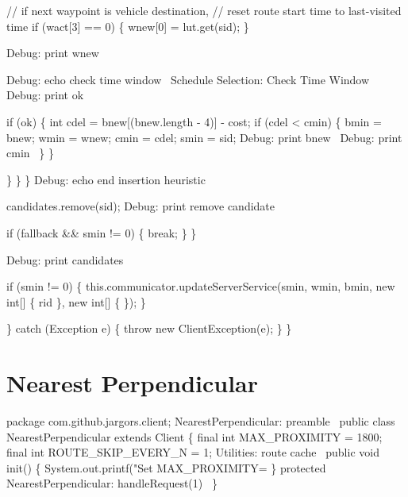             // if next waypoint is vehicle destination,
            // reset route start time to last-visited time
            if (wact[3] == 0) \{
              wnew[0] = lut.get(sid);
            \}

            \LA{}Debug: print wnew~{\nwtagstyle{}}\RA{}

            \LA{}Debug: echo check time window~{\nwtagstyle{}}\RA{}
            \LA{}Schedule Selection: Check Time Window~{\nwtagstyle{}}\RA{}
            \LA{}Debug: print ok~{\nwtagstyle{}}\RA{}

            if (ok) \{
              int cdel = bnew[(bnew.length - 4)] - cost;
              if (cdel < cmin) \{
                bmin = bnew;
                wmin = wnew;
                cmin = cdel;
                smin = sid;
                \LA{}Debug: print bnew~{\nwtagstyle{}}\RA{}
                \LA{}Debug: print cmin~{\nwtagstyle{}}\RA{}
              \}
            \}

          \}
        \}
      \}
      \LA{}Debug: echo end insertion heuristic~{\nwtagstyle{}}\RA{}

      candidates.remove(sid);
      \LA{}Debug: print remove candidate~{\nwtagstyle{}}\RA{}

      if (fallback && smin != 0) \{
        break;
      \}
    \}

    \LA{}Debug: print candidates~{\nwtagstyle{}}\RA{}

    if (smin != 0) \{
      this.communicator.updateServerService(smin, wmin, bmin,
          new int[] \{ rid \}, new int[] \{ \});
    \}

  \} catch (Exception e) \{
    throw new ClientException(e);
  \}
\}
\nwendcode{}\nwdocspar

\section{Nearest Perpendicular}

\nwenddocs{}\endmoddef\nwstartdeflinemarkup\nwenddeflinemarkup
package com.github.jargors.client;
\LA{}NearestPerpendicular: preamble~{\nwtagstyle{}}\RA{}
public class NearestPerpendicular extends Client \{
  final int MAX_PROXIMITY = 1800;
  final int ROUTE_SKIP_EVERY_N = 1;
  \LA{}Utilities: route cache~{\nwtagstyle{}}\RA{}
  public void init() \{
    System.out.printf("Set MAX_PROXIMITY=%
  \}
  protected \LA{}NearestPerpendicular: handleRequest(1)~{\nwtagstyle{}}\RA{}
\}
\nwendcode{}\nwdocspar

